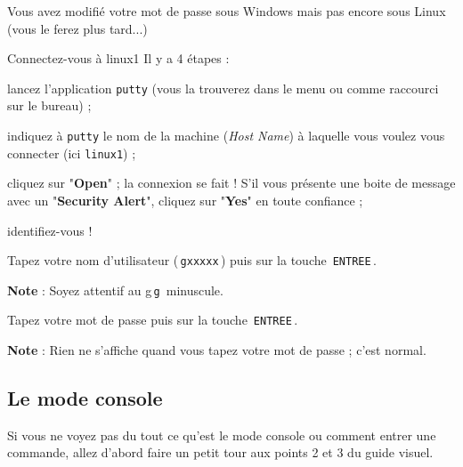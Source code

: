 \documentclass[a4paper,11pt]{article}
\begin{document}
\par
        
Vous avez modifi\'e votre mot de passe sous Windows mais pas encore sous Linux (vous le ferez plus tard...)
				
\begin{Tutoriel}{Connectez-vous \`a linux1} 
Il y a 4 \'etapes :
\par
        
\begin{steps}
				
\item lancez l'application \verb_putty_ (vous la trouverez dans le menu ou comme raccourci sur le bureau) ;
					
\item indiquez \`a \verb_putty_ le nom de la machine (\textit{Host Name}) \`a laquelle vous voulez vous connecter (ici \verb_linux1_) ;

\item cliquez sur "\textbf{Open}" ; la connexion se fait ! S'il vous pr\'esente une boite de message avec un "\textbf{Security Alert}", cliquez sur "\textbf{Yes}" en toute confiance ;
					
\item identifiez-vous !
						
\begin{steps}
\item Tapez votre nom d'utilisateur (\,\verb|gxxxxx|\,) puis sur la touche \,\verb|ENTREE|\,.\par 
\textbf{Note} : Soyez attentif au g\,\verb|g|\, minuscule.

\item Tapez votre mot de passe puis sur la touche \,\verb|ENTREE|\,.\par
\textbf{Note} : Rien ne s'affiche quand vous tapez votre mot de passe ; c'est normal.
\end{steps}
\end{steps}
\end{Tutoriel}		       

\subsection{Le mode console}
Si vous ne voyez pas du tout ce qu'est le mode console ou comment entrer une commande, allez d'abord faire un petit tour aux points 2 et 3 du guide visuel.
				
\end{document}
